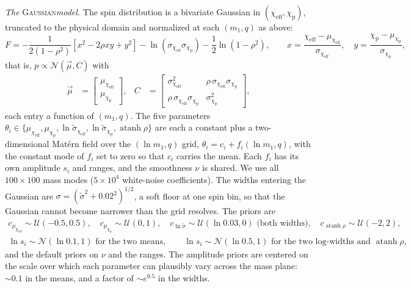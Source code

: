 \documentclass[%
 onecolumn,
 amsmath,amssymb,
 aps,
 prl,
 nofootinbib,nobibnotes,
]{revtex4-2}
\newcommand{\chieff}{\ensuremath{\chi_{\mathrm{eff}}}}
\newcommand{\chip}{\ensuremath{\chi_{\mathrm{p}}}}
\newcommand{\gaussianspins}{\textsc{Gaussian}\xspace}
\begin{document}
\textit{The} \gaussianspins \textit{model.} The spin distribution is a bivariate Gaussian in $(\chieff, \chip)$, truncated to the physical domain and normalized at each $(m_1, q)$ as above:
\begin{equation}
    F = -\frac{1}{2(1 - \rho^2)}\left[x^2 - 2\rho x y + y^2\right] - \ln(\sigma_{\chieff} \sigma_{\chip}) - \frac{1}{2}\ln(1 - \rho^2), \qquad
    x = \frac{\chieff - \mu_{\chieff}}{\sigma_{\chieff}}, \quad y = \frac{\chip - \mu_{\chip}}{\sigma_{\chip}},
\end{equation}
that is, $p \propto \mathcal{N}(\vec{\mu}, C)$ with
\begin{align}
    \vec{\mu} &= \begin{bmatrix} \mu_{\chieff} \\ \mu_{\chip} \end{bmatrix}, &
    C &= \begin{bmatrix}
    \sigma^2_{\chieff} & \rho\,\sigma_{\chieff}\sigma_{\chip} \\
    \rho\,\sigma_{\chieff}\sigma_{\chip} & \sigma^2_{\chip}
    \end{bmatrix}, \label{eq: gaussian cov}
\end{align}
each entry a function of $(m_1, q)$. The five parameters $\theta_i \in \{\mu_{\chieff}, \mu_{\chip}, \ln\tilde{\sigma}_{\chieff}, \ln\tilde{\sigma}_{\chip}, \operatorname{atanh}\rho\}$ are each a constant plus a two-dimensional Mat\'ern field over the $(\ln m_1, q)$ grid, $\theta_i = c_i + f_i(\ln m_1, q)$, with the constant mode of $f_i$ set to zero so that $c_i$ carries the mean. Each $f_i$ has its own amplitude $s_i$ and ranges, and the smoothness $\nu$ is shared. We use all $100 \times 100$ mass modes ($5 \times 10^4$ white-noise coefficients). The widths entering the Gaussian are $\sigma = (\tilde{\sigma}^2 + 0.02^2)^{1/2}$, a soft floor at one spin bin, so that the Gaussian cannot become narrower than the grid resolves. The priors are
\begin{gather}
    c_{\mu_{\chieff}} \sim \mathcal{U}(-0.5, 0.5), \quad c_{\mu_{\chip}} \sim \mathcal{U}(0, 1), \quad c_{\ln\tilde{\sigma}} \sim \mathcal{U}(\ln 0.03, 0) \text{ (both widths)}, \quad c_{\operatorname{atanh}\rho} \sim \mathcal{U}(-2, 2), \\
    \ln s_i \sim \mathcal{N}(\ln 0.1, 1) \text{ for the two means}, \qquad \ln s_i \sim \mathcal{N}(\ln 0.5, 1) \text{ for the two log-widths and } \operatorname{atanh}\rho,
\end{gather}
and the default priors on $\nu$ and the ranges. The amplitude priors are centered on the scale over which each parameter can plausibly vary across the mass plane: $\sim 0.1$ in the means, and a factor of $\sim e^{0.5}$ in the widths.
\end{document}
